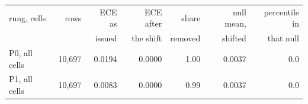 \begin{tabular}{lrrrrrr}
\toprule
rung, cells & rows & ECE as & ECE after & share & null mean, & percentile in \\
 & & issued & the shift & removed & shifted & that null \\
\midrule
P0, all cells & 10,697 & 0.0194 & 0.0000 & 1.00 & 0.0037 & 0.0 \\
P1, all cells & 10,697 & 0.0083 & 0.0000 & 0.99 & 0.0037 & 0.0 \\

\end{tabular}
